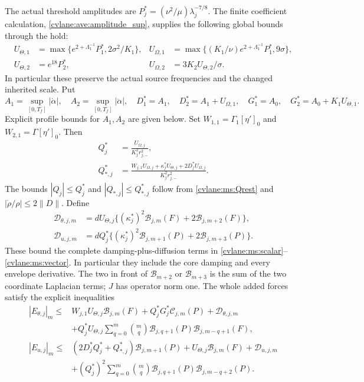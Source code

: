 The actual threshold amplitudes are
$P_j^*=(\nu^2/\mu)\lambda_j^{-7/8}$. The finite coefficient
calculation, \eqref{cvlane:ave:amplitude_sup}, supplies the following global
bounds through the hold:
\begin{align}
 U_{\Theta,1}&=\max\{e^{2+\Lambda_1^{-1}}P_1^*,2\sigma^2/K_1\},
 &U_{\Omega,1}&=\max\{(K_1/\nu)e^{2+\Lambda_1^{-1}}P_1^*,9\sigma\},
 \nonumber\\
 U_{\Theta,2}&=e^{18}P_2^*,
 &U_{\Omega,2}&=3K_2U_{\Theta,2}/\sigma.
 \label{cvlane:ms:amplitudebounds}
\end{align}
In particular these preserve the actual source frequencies and
the changed inherited scale. Put
\[
 A_1=\sup_{[0,T_f]}|\dot\alpha|,\quad
 A_2=\sup_{[0,T_f]}|\ddot\alpha|,\quad
 D_1^*=A_1,\quad D_2^*=A_1+U_{\Omega,1},\quad
 G_1^*=A_0,\quad G_2^*=A_0+K_1U_{\Theta,1}.
\]
Explicit profile bounds for $A_1,A_2$ are given below. Set
$W_{1,1}=\Gamma_1[\eta']_0$ and
$W_{2,1}=\Gamma[\eta']_0$. Then
\begin{align}
 Q_j^*&=\frac{U_{\Omega,j}}{K_j^2r_{j,-}^2},\nonumber\\
 Q_{*,j}^*&=\frac{W_{j,1}U_{\Omega,j}
          +\kappa_j^* U_{\Theta,j}+2D_j^*U_{\Omega,j}}
                       {K_j^2r_{j,-}^2}.
 \label{cvlane:ms:Qbounds}
\end{align}
The bounds $|Q_j|\leq Q_j^*$ and $|Q_{*,j}|\leq Q_{*,j}^*$
follow from \eqref{cvlane:ms:Qrest} and
$|\dot\rho/\rho|\leq2\|D\|$. Define
\begin{align}
 \mathcal D_{\theta,j,m}
 &=dU_{\Theta,j}\{(\kappa_j^*)^2\mathcal B_{j,m}(F)
                                      +2\mathcal B_{j,m+2}(F)\},\nonumber\\
 \mathcal D_{u,j,m}
 &=dQ_j^*\{(\kappa_j^*)^2\mathcal B_{j,m+1}(P)
                                      +2\mathcal B_{j,m+3}(P)\}.
 \label{cvlane:ms:diffnorm}
\end{align}
These bound the complete damping-plus-diffusion terms in
\eqref{cvlane:ms:scalar}--\eqref{cvlane:ms:vector}. In particular they include
the core damping and every envelope derivative. The two in front
of $\mathcal B_{m+2}$ or $\mathcal B_{m+3}$ is the sum of the
two coordinate Laplacian terms; $J$ has operator norm one.
The whole added forces satisfy the explicit inequalities
\begin{align}
 |E_{\theta,j}|_m\leq{}&W_{j,1}U_{\Theta,j}\mathcal B_{j,m}(F)
   +Q_j^*G_j^*\mathcal C_{j,m}(P)+\mathcal D_{\theta,j,m}\nonumber\\
 &+Q_j^*U_{\Theta,j}\sum_{q=0}^m\binom mq
        \mathcal B_{j,q+1}(P)\mathcal B_{j,m-q+1}(F),
 \label{cvlane:ms:fullscalarnorm}\\
 |E_{u,j}|_m\leq{}&(2D_j^*Q_j^*+Q_{*,j}^*)\mathcal B_{j,m+1}(P)
                  +U_{\Theta,j}\mathcal B_{j,m}(F)+\mathcal D_{u,j,m}
 \nonumber\\
 &+(Q_j^*)^2\sum_{q=0}^m\binom mq
            \mathcal B_{j,q+1}(P)\mathcal B_{j,m-q+2}(P).
 \label{cvlane:ms:fullvectornorm}
\end{align}
